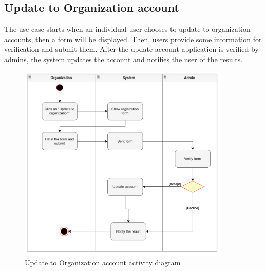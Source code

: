 \subsection{Update to Organization account}
The use case starts when an individual user chooses to update to organization accounts, then a form will be displayed. Then, users provide some information for verification and submit them. After the update-account application is verified by admins, the system updates the account and notifies the user of the results.
\begin{figure}[H]
  \centering
  \includegraphics[width=0.9\textwidth]{Figures/update_org.png}
  \caption{Update to Organization account activity diagram}
  \label{fig:update-org}
\end{figure}
\newpage

